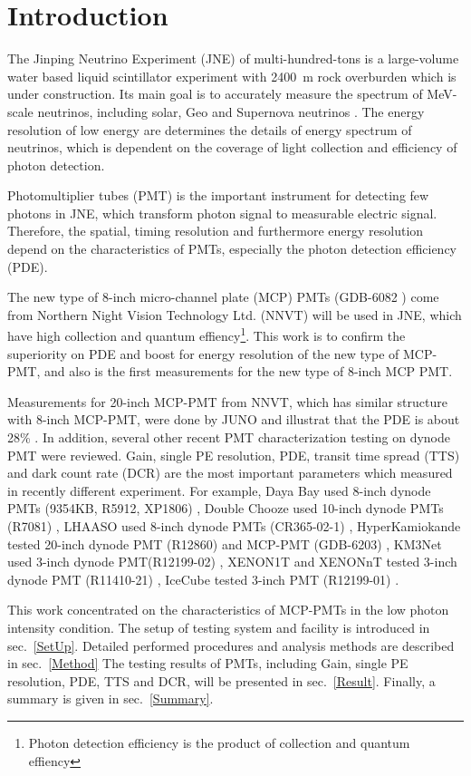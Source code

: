 \section{Introduction}
The Jinping Neutrino Experiment (JNE) of multi-hundred-tons is a large-volume water based liquid scintillator experiment with \SI{2400}{m} rock overburden \cite{LetterJNE2017} which is under construction. Its main goal is to accurately measure the spectrum of MeV-scale neutrinos, including solar, Geo and Supernova neutrinos \cite{LetterJNE2017}.  The energy resolution of low energy are determines the details of energy spectrum of neutrinos, which is dependent on the coverage of light collection and efficiency of photon detection.

Photomultiplier tubes (PMT) is the important instrument for detecting few photons in JNE, which transform photon signal to measurable electric signal. Therefore, the spatial, timing resolution and furthermore energy resolution depend on the characteristics of PMTs, especially the photon detection efficiency (PDE). 

The new type of 8-inch micro-channel plate (MCP) PMTs (GDB-6082 \cite{GDB-6082}) come from Northern Night Vision Technology Ltd. (NNVT) will be used in JNE, which have high collection and quantum effiency\footnote{Photon detection efficiency is the product of collection and quantum effiency}. This work is to confirm the superiority on PDE and boost for energy resolution of the new type of MCP-PMT, and also is the first measurements for the new type of 8-inch MCP PMT.

Measurements for 20-inch MCP-PMT from NNVT, which has similar structure with 8-inch MCP-PMT, were done by JUNO and illustrat that the PDE is about 28\% \cite{JUNOMassTesting}. In addition, several other recent PMT characterization testing on dynode PMT were reviewed. Gain, single PE resolution, PDE, transit time spread (TTS) and dark count rate (DCR) are the most important parameters which measured in recently different experiment. For example, Daya Bay used 8-inch dynode PMTs (9354KB, R5912, XP1806) \cite{DayaBayTesting}, Double Chooze used 10-inch dynode PMTs (R7081) \cite{DoubleChoozeTesting}, LHAASO used 8-inch dynode PMTs (CR365-02-1) \cite{LHAASOTesting}, HyperKamiokande tested 20-inch dynode PMT (R12860) and MCP-PMT (GDB-6203) \cite{HyperKTesting}, KM3Net used 3-inch dynode PMT(R12199-02) \cite{KM3NetTesting}, XENON1T and XENONnT tested 3-inch dynode PMT (R11410-21) \cite{XENON1TTesting}\cite{XENONnTTesting}, IceCube tested 3-inch PMT (R12199-01) \cite{IceCubeTesting}.

This work concentrated on the characteristics of MCP-PMTs in the low photon intensity condition. The setup of testing system and facility is introduced in sec.~\ref{SetUp}. Detailed performed procedures and analysis methods are described in sec.~\ref{Method} The testing results of PMTs, including Gain, single PE resolution, PDE, TTS and DCR, will be presented in sec.~\ref{Result}. Finally, a summary is given in sec.~\ref{Summary}.